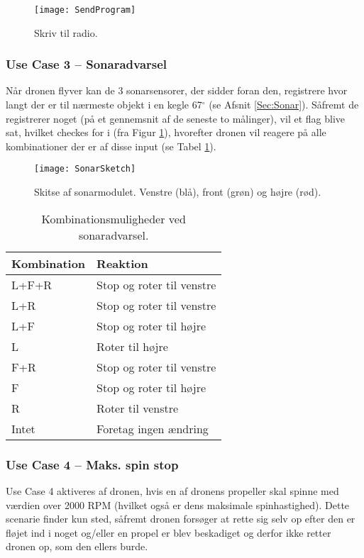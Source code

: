 \documentclass[Main]{subfiles}
\begin{document}
\begin{figure}[H]
\centering
\texttt{[image: SendProgram]}
\caption{Skriv til radio.}
\label{Fig:SendProgram}
\end{figure}


\newpage
\subsubsection{Use Case 3 -- Sonaradvarsel}
Når dronen flyver kan de 3 sonarsensorer, der sidder foran den, registrere hvor langt der er til nærmeste objekt i en kegle 67$^{\circ}$ (se Afsnit \ref{Sec:Sonar}).
Såfremt de registrerer noget (på et gennemsnit af de seneste to målinger), vil et flag blive sat, hvilket checkes for i  (fra Figur \ref{Fig:SendProgram}), hvorefter dronen vil reagere på alle kombinationer der er af disse input (se Tabel \ref{Tab:SonarAdvarsel}).


\begin{figure}[H]
\centering
\texttt{[image: SonarSketch]}
\caption{Skitse af sonarmodulet. Venstre (blå), front (grøn) og højre (rød).}
\label{Fig:SonarSketch}
\end{figure}

\begin{table}[H]
\centering
	\begin{tabular}{l l}
	\hline Kombination & Reaktion
	\\ \hline 
	L+F+R & Stop og roter til venstre \\
	L+R & Stop og roter til venstre\\
	L+F & Stop og roter til højre\\
	L & Roter til højre\\
	F+R & Stop og roter til venstre\\
	F & Stop og roter til højre\\
	R & Roter til venstre\\
	Intet & Foretag ingen ændring \\ \hline
	\end{tabular}
\caption{Kombinationsmuligheder ved sonaradvarsel.}
\label{Tab:SonarAdvarsel}
\end{table}

\newpage
\subsubsection{Use Case 4 -- Maks. spin stop}
Use Case 4 aktiveres af dronen, hvis en af dronens propeller skal spinne med værdien over 2000 RPM (hvilket også er dens maksimale spinhastighed).
Dette scenarie finder kun sted, såfremt dronen forsøger at rette sig selv op efter den er fløjet ind i noget og/eller en propel er blev beskadiget og derfor ikke retter dronen op, som den ellers burde.
\end{document}
